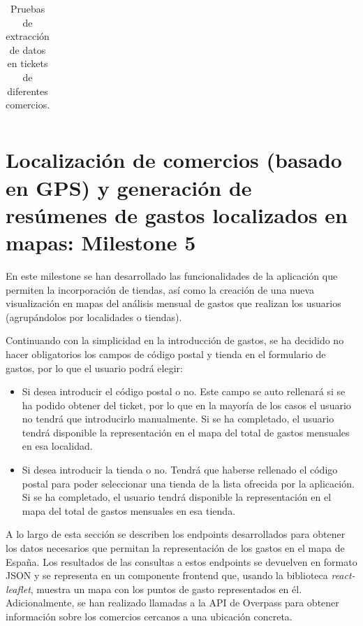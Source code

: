 \begin{landscape}
\begin{table}[]
\begin{tabular}{|p{3cm}|p{3cm}|l|l|l|l|p{3cm}|l|}
    \end{tabular}
    \caption{Pruebas de extracción de datos en tickets de diferentes comercios.}
    \label{tab:pruebas_extraccion_datos}
    \end{table}
\end{landscape}
    


\section{Localización de comercios (basado en GPS) y generación de resúmenes de gastos localizados en mapas: Milestone 5} \label{chap:milestone5}
En este milestone se han desarrollado las funcionalidades de la aplicación que permiten la incorporación de tiendas, así como la creación de una nueva visualización en mapas del análisis mensual de gastos que realizan los usuarios (agrupándolos por localidades o tiendas).

Continuando con la simplicidad en la introducción de gastos, se ha decidido no hacer obligatorios los campos de código postal y tienda en el formulario de gastos, por lo que el usuario podrá elegir:

\begin{itemize}
    \item Si desea introducir el código postal o no. Este campo se auto rellenará si se ha podido obtener del ticket, por lo que en la mayoría de los casos el usuario no tendrá que introducirlo manualmente. Si se ha completado, el usuario tendrá disponible la representación en el mapa del total de gastos mensuales en esa localidad. 
    
    \item Si desea introducir la tienda o no. Tendrá que haberse rellenado el código postal para poder seleccionar una tienda de la lista ofrecida por la aplicación. Si se ha completado, el usuario tendrá disponible la representación en el mapa del total de gastos mensuales en esa tienda.
\end{itemize}

A lo largo de esta sección se describen los endpoints desarrollados para obtener los datos necesarios que permitan la representación de los gastos en el mapa de España. Los resultados de las consultas a estos endpoints se devuelven en formato JSON y se representa en un componente frontend que, usando la biblioteca \textit{react-leaflet}, muestra un mapa con los puntos de gasto representados en él. Adicionalmente, se han realizado llamadas a la API de Overpass para obtener información sobre los comercios cercanos a una ubicación concreta.


